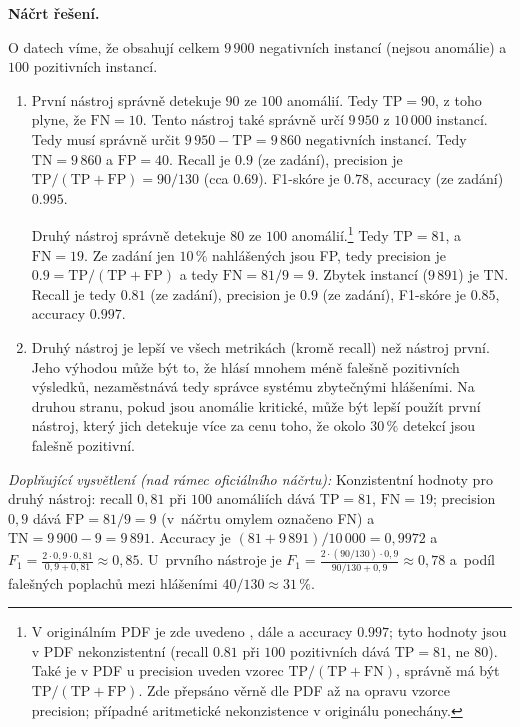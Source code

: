 \medskip
\noindent\textbf{Náčrt řešení.}\par
O datech víme, že obsahují celkem $9\,900$ negativních instancí (nejsou anomálie) a $100$ pozitivních instancí.
\begin{enumerate}
  \item První nástroj správně detekuje $90$ ze $100$ anomálií. Tedy $\mathrm{TP} = 90$, z toho plyne, že
    $\mathrm{FN} = 10$. Tento nástroj také správně určí $9\,950$ z $10\,000$ instancí. Tedy musí správně určit
    $9\,950 - \mathrm{TP} = 9\,860$ negativních instancí. Tedy $\mathrm{TN} = 9\,860$ a $\mathrm{FP} = 40$.
    Recall je $0.9$ (ze zadání), precision je $\mathrm{TP}/(\mathrm{TP}+\mathrm{FP}) = 90/130$ (cca $0.69$).
    F1-skóre je $0.78$, accuracy (ze zadání) $0.995$.

    \medskip
    Druhý nástroj správně detekuje $80$ ze $100$ anomálií.\footnote{V originálním PDF je zde uvedeno
    , dále  a accuracy $0.997$;
    tyto hodnoty jsou v PDF nekonzistentní (recall $0.81$ při $100$ pozitivních dává $\mathrm{TP}=81$,
    ne $80$). Také je v PDF u precision uveden vzorec $\mathrm{TP}/(\mathrm{TP}+\mathrm{FN})$, správně má
    být $\mathrm{TP}/(\mathrm{TP}+\mathrm{FP})$. Zde přepsáno věrně dle PDF až na opravu vzorce precision;
    případné aritmetické nekonzistence v originálu ponechány.}
    Tedy $\mathrm{TP} = 81$, a $\mathrm{FN} = 19$. Ze zadání jen $10\,\%$ nahlášených jsou FP, tedy
    precision je $0.9 = \mathrm{TP}/(\mathrm{TP}+\mathrm{FP})$ a tedy $\mathrm{FN} = 81/9 = 9$. Zbytek instancí
    ($9\,891$) je TN. Recall je tedy $0.81$ (ze zadání), precision je $0.9$ (ze zadání), F1-skóre je $0.85$,
    accuracy $0.997$.
  \item Druhý nástroj je lepší ve všech metrikách (kromě recall) než nástroj první. Jeho výhodou může být to,
    že hlásí mnohem méně falešně pozitivních výsledků, nezaměstnává tedy správce systému zbytečnými hlášeními.
    Na druhou stranu, pokud jsou anomálie kritické, může být lepší použít první nástroj, který jich detekuje
    více za cenu toho, že okolo $30\,\%$ detekcí jsou falešně pozitivní.
\end{enumerate}

\medskip
\noindent\textit{Doplňující vysvětlení (nad rámec oficiálního náčrtu):} Konzistentní hodnoty pro druhý nástroj: recall $0{,}81$ při $100$ anomáliích dává $\mathrm{TP}=81$, $\mathrm{FN}=19$; precision $0{,}9$ dává $\mathrm{FP}=81/9=9$ (v~náčrtu omylem označeno FN) a~$\mathrm{TN}=9\,900-9=9\,891$. Accuracy je $(81+9\,891)/10\,000=0{,}9972$ a~$F_1=\frac{2\cdot0{,}9\cdot0{,}81}{0{,}9+0{,}81}\approx0{,}85$. U~prvního nástroje je $F_1=\frac{2\cdot(90/130)\cdot0{,}9}{90/130+0{,}9}\approx0{,}78$ a~podíl falešných poplachů mezi hlášeními $40/130\approx31\,\%$.
